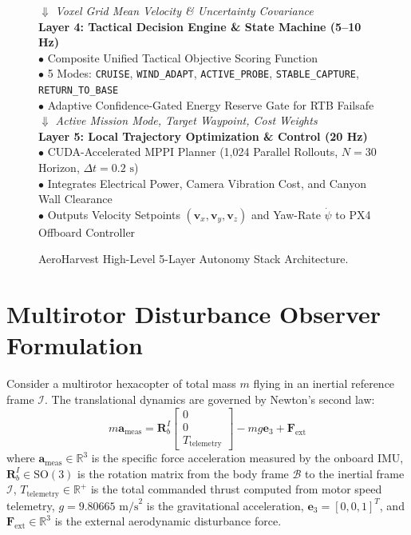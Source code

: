 \documentclass[12pt,a4paper,oneside]{report}
\begin{document}
\begin{figure}[H]
{\begin{minipage}{0.94\linewidth}
        \centering $\Downarrow$ \textit{Voxel Grid Mean Velocity \& Uncertainty Covariance}\\[2mm]
        \flushleft \textbf{Layer 4: Tactical Decision Engine \& State Machine (5--10 Hz)}\\
        $\bullet$ Composite Unified Tactical Objective Scoring Function\\
        $\bullet$ 5 Modes: \texttt{CRUISE}, \texttt{WIND\_ADAPT}, \texttt{ACTIVE\_PROBE}, \texttt{STABLE\_CAPTURE}, \texttt{RETURN\_TO\_BASE}\\
        $\bullet$ Adaptive Confidence-Gated Energy Reserve Gate for RTB Failsafe\\[2mm]
        \centering $\Downarrow$ \textit{Active Mission Mode, Target Waypoint, Cost Weights}\\[2mm]
        \flushleft \textbf{Layer 5: Local Trajectory Optimization \& Control (20 Hz)}\\
        $\bullet$ CUDA-Accelerated MPPI Planner (1,024 Parallel Rollouts, $N=30$ Horizon, $\Delta t = 0.2\text{ s}$)\\
        $\bullet$ Integrates Electrical Power, Camera Vibration Cost, and Canyon Wall Clearance\\
        $\bullet$ Outputs Velocity Setpoints $(\mathbf{v}_x, \mathbf{v}_y, \mathbf{v}_z)$ and Yaw-Rate $\dot{\psi}$ to PX4 Offboard Controller\\[2mm]
    \end{minipage}%
    }
    \caption{AeroHarvest High-Level 5-Layer Autonomy Stack Architecture.}
    \label{fig:arch_diagram}
\end{figure}

\section{Multirotor Disturbance Observer Formulation}
Consider a multirotor hexacopter of total mass $m$ flying in an inertial reference frame $\mathcal{I}$. The translational dynamics are governed by Newton's second law:
\begin{equation}
    m \mathbf{a}_{\text{meas}} = \mathbf{R}_b^I \begin{bmatrix} 0 \\ 0 \\ T_{\text{telemetry}} \end{bmatrix} - m g \mathbf{e}_3 + \mathbf{F}_{\text{ext}}
    \label{eq:trans_eom}
\end{equation}
where $\mathbf{a}_{\text{meas}} \in \mathbb{R}^3$ is the specific force acceleration measured by the onboard IMU, $\mathbf{R}_b^I \in \text{SO}(3)$ is the rotation matrix from the body frame $\mathcal{B}$ to the inertial frame $\mathcal{I}$, $T_{\text{telemetry}} \in \mathbb{R}^+$ is the total commanded thrust computed from motor speed telemetry, $g = 9.80665\text{ m/s}^2$ is the gravitational acceleration, $\mathbf{e}_3 = [0, 0, 1]^T$, and $\mathbf{F}_{\text{ext}} \in \mathbb{R}^3$ is the external aerodynamic disturbance force.
\end{document}

